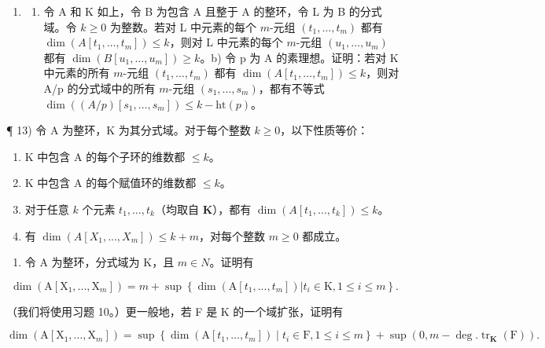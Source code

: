 \begin{enumerate}
\def\labelenumi{\arabic{enumi})}
\setcounter{enumi}{11}
\tightlist
\item
  \begin{enumerate}
  \def\labelenumii{\alph{enumii})}
  \tightlist
  \item
    令 A 和 K 如上，令 B 为包含 A 且整于 A 的整环，令 L 为 B 的分式域。令 \(k \geqslant 0\) 为整数。若对 L 中元素的每个 \(m\)-元组 \((t_1, \ldots, t_m)\) 都有 \(\dim(A[t_1, \ldots, t_m]) \leqslant k\)，则对 L 中元素的每个 \(m\)-元组 \((u_1, \ldots, u_m)\) 都有 \(\dim(B[u_1, \ldots, u_m]) \geqslant k\)。b) 令 p 为 A 的素理想。证明：若对 K 中元素的所有 \(m\)-元组 \((t_1, \ldots, t_m)\) 都有 \(\dim(A[t_1, \ldots, t_m]) \leqslant k\)，则对 A/p 的分式域中的所有 \(m\)-元组 \((s_1, \ldots, s_m)\)，都有不等式 \(\dim((A/p)[s_1, \ldots, s_m]) \leqslant k - \text{ht}(p)\)。
  \end{enumerate}
\end{enumerate}

¶ 13) 令 A 为整环，K 为其分式域。对于每个整数 \(k \geqslant 0\)，以下性质等价：

\begin{enumerate}
\def\labelenumi{(\roman{enumi})}
\item
  K 中包含 A 的每个子环的维数都 \(\leqslant k\)。
\item
  K 中包含 A 的每个赋值环的维数都 \(\leqslant k\)。
\item
  对于任意 \(k\) 个元素 \(t_1, \ldots, t_k\)（均取自 \(\mathbf{K}\)），都有 \(\dim(A[t_1, \ldots, t_k]) \leqslant k\)。
\item
  有 \(\dim(A[X_1, ..., X_m]) \leqslant k + m\)，对每个整数 \(m \geqslant 0\) 都成立。
\end{enumerate}

\begin{enumerate}
\def\labelenumi{\arabic{enumi})}
\setcounter{enumi}{13}
\tightlist
\item
  令 A 为整环，分式域为 K，且 \(m \in N\)。证明有
\end{enumerate}

\[
\dim (\mathrm{A} [ \mathrm{X} _ {1},..., \mathrm{X} _ {m} ]) = m + \sup \left\{\dim (\mathrm{A} [ t _ {1},..., t _ {m} ]) | t _ {i} \in \mathrm{K}, 1 \leqslant i \leqslant m \right\}.
\]

（我们将使用习题 10。）更一般地，若 F 是 K 的一个域扩张，证明有

\[
\dim \left(\mathrm{A} \left[ \mathrm{X} _ {1}, \dots , \mathrm{X} _ {m} \right]\right) = \sup \left\{\dim (\mathrm{A} \left[ t _ {1}, \dots , t _ {m} \right]) \mid t _ {i} \in \mathrm{F}, 1 \leqslant i \leqslant m \right\} + \sup (0, m - \deg . \operatorname{tr} _ {\mathbf {K}} (\mathrm{F})).
\]

